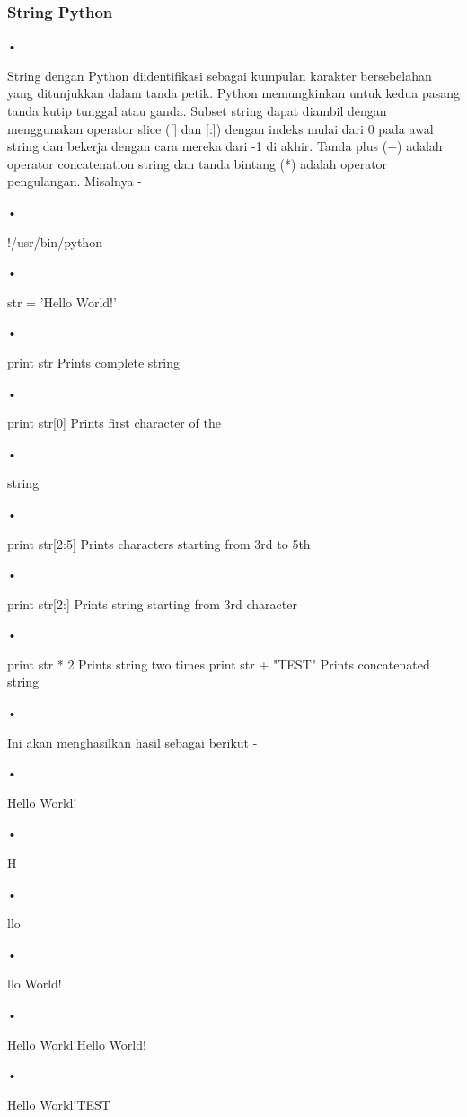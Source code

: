 \documentclass{wileySix}
\begin{document}
\subsubsection{String Python}
\begin{flushleft}
•
\end{flushleft}String dengan Python diidentifikasi sebagai kumpulan karakter bersebelahan yang ditunjukkan dalam tanda petik. Python memungkinkan untuk kedua pasang tanda kutip tunggal atau ganda. Subset string dapat diambil dengan menggunakan operator slice ([] dan [:]) dengan indeks mulai dari 0 pada awal string dan bekerja dengan cara mereka dari -1 di akhir.
Tanda plus (+) adalah operator concatenation string dan tanda bintang (*) adalah operator pengulangan. Misalnya -
\begin{flushleft}
•
\end{flushleft}!/usr/bin/python
\begin{flushleft}
•
\end{flushleft}str = 'Hello World!'

\begin{flushleft}
•
\end{flushleft}print str            Prints complete string
\begin{flushleft}
•
\end{flushleft}print str[0]         Prints first character of the \begin{flushleft}
•
\end{flushleft}string
\begin{flushleft}
•
\end{flushleft}print str[2:5]       Prints characters starting from 3rd to 5th
\begin{flushleft}
•
\end{flushleft}print str[2:]        Prints string starting from 3rd character
\begin{flushleft}
•
\end{flushleft}print str * 2        Prints string two times
print str + "TEST"   Prints concatenated string
\begin{flushleft}
•
\end{flushleft}Ini akan menghasilkan hasil sebagai berikut -
\begin{flushleft}
•
\end{flushleft}Hello World!
\begin{flushleft}
•
\end{flushleft}H
\begin{flushleft}
•
\end{flushleft}llo
\begin{flushleft}
•
\end{flushleft}llo World!
\begin{flushleft}
•
\end{flushleft}Hello World!Hello World!
\begin{flushleft}
•
\end{flushleft}Hello World!TEST
\end{document}
